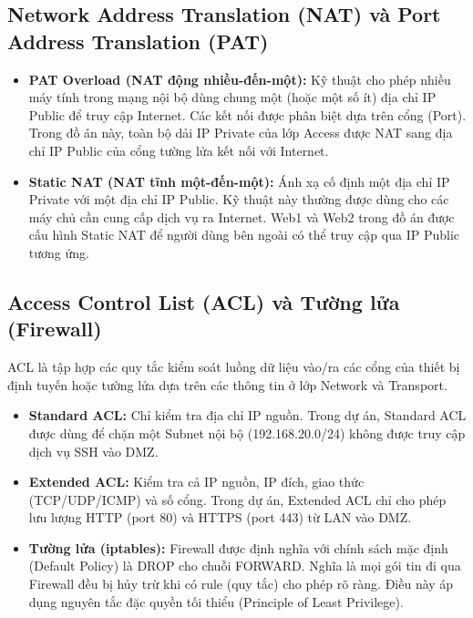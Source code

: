 \subsection{Network Address Translation (NAT) và Port Address Translation (PAT)}
\begin{itemize}
    \item \textbf{PAT Overload (NAT động nhiều-đến-một):} Kỹ thuật cho phép nhiều máy tính trong mạng nội bộ dùng chung một (hoặc một số ít) địa chỉ IP Public để truy cập Internet. Các kết nối được phân biệt dựa trên cổng (Port). Trong đồ án này, toàn bộ dải IP Private của lớp Access được NAT sang địa chỉ IP Public của cổng tường lửa kết nối với Internet.
    \item \textbf{Static NAT (NAT tĩnh một-đến-một):} Ánh xạ cố định một địa chỉ IP Private với một địa chỉ IP Public. Kỹ thuật này thường được dùng cho các máy chủ cần cung cấp dịch vụ ra Internet. Web1 và Web2 trong đồ án được cấu hình Static NAT để người dùng bên ngoài có thể truy cập qua IP Public tương ứng.
\end{itemize}

\subsection{Access Control List (ACL) và Tường lửa (Firewall)}
ACL là tập hợp các quy tắc kiểm soát luồng dữ liệu vào/ra các cổng của thiết bị định tuyến hoặc tường lửa dựa trên các thông tin ở lớp Network và Transport.
\begin{itemize}
    \item \textbf{Standard ACL:} Chỉ kiểm tra địa chỉ IP nguồn. Trong dự án, Standard ACL được dùng để chặn một Subnet nội bộ (192.168.20.0/24) không được truy cập dịch vụ SSH vào DMZ.
    \item \textbf{Extended ACL:} Kiểm tra cả IP nguồn, IP đích, giao thức (TCP/UDP/ICMP) và số cổng. Trong dự án, Extended ACL chỉ cho phép lưu lượng HTTP (port 80) và HTTPS (port 443) từ LAN vào DMZ.
    \item \textbf{Tường lửa (iptables):} Firewall được định nghĩa với chính sách mặc định (Default Policy) là DROP cho chuỗi FORWARD. Nghĩa là mọi gói tin đi qua Firewall đều bị hủy trừ khi có rule (quy tắc) cho phép rõ ràng. Điều này áp dụng nguyên tắc đặc quyền tối thiểu (Principle of Least Privilege).
\end{itemize}

